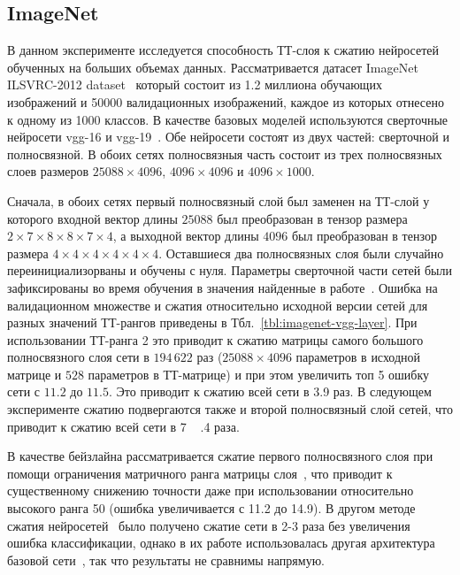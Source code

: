 \subsection{ImageNet}
В данном эксперименте исследуется способность ТТ-слоя к сжатию нейросетей обученных на больших объемах данных. Рассматривается датасет ImageNet ILSVRC-2012 dataset~\cite{Russakovsky2015ImageNet} который состоит из 1.2 миллиона обучающих изображений и 50000 валидационных изображений, каждое из которых отнесено к одному из 1000 классов. В качестве базовых моделей используются сверточные нейросети vgg-16 и vgg-19~\cite{simonyan15}. Обе нейросети состоят из двух частей: сверточной и полносвязной. В обоих сетях полносвязныя часть состоит из трех полносвязных слоев размеров $25088 \times 4096$, $4096 \times 4096$ и $4096 \times 1000$.

Сначала, в обоих сетях первый полносвязный слой был заменен на ТТ-слой у которого входной вектор длины $25088$ был преобразован в тензор размера $2 \times 7 \times 8 \times 8 \times 7 \times 4$, а выходной вектор длины $4096$ был преобразован в тензор размера $4 \times 4 \times 4 \times 4 \times 4 \times 4$. Оставшиеся два полносвязных слоя были случайно переинициализорваны и обучены с нуля. Параметры сверточной части сетей были зафиксированы во время обучения в значения найденные в работе~\cite{Russakovsky2015ImageNet}. Ошибка на валидационном множестве и сжатия относительно исходной версии сетей для разных значений ТТ-рангов приведены в Тбл.~\ref{tbl:imagenet-vgg-layer}. При использовании ТТ-ранга 2 это приводит к сжатию матрицы самого большого полносвязного слоя сети в $194\,622$ раз ($25088 \times 4096$ параметров в исходной матрице и $528$ параметров в ТТ-матрице) и при этом увеличить топ 5 ошибку сети с $11.2$ до $11.5$. Это приводит к сжатию всей сети в 3.9 раз. В следующем эксперименте сжатию подвергаются также и второй полносвязный слой сетей, что приводит к сжатию всей сети в 7.4 раза.

В качестве бейзлайна рассматривается сжатие первого полносвязного слоя при помощи ограничения матричного ранга матрицы слоя~\cite{Jimmy2014lowRankSNN}, что приводит к существенному снижению точности даже при использовании относительно высокого ранга 50 (ошибка увеличивается с 11.2 до 14.9). В другом методе сжатия нейросетей~\cite{yang2014deep} было получено сжатие сети в 2-3 раза без увеличения ошибка классификации, однако в их работе использовалась другая архитектура базовой сети~\cite{Krizhevsky2012AlexNet}, так что результаты не сравнимы напрямую.

